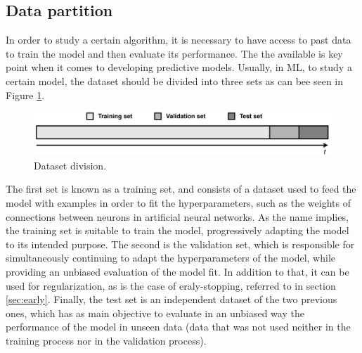 \subsection{Data partition}\label{sec:datap}

In order to study a certain algorithm, it is necessary to have access to past data to train the model and then evaluate its performance. The the available is key point when it comes to developing predictive models. Usually, in \ac{ML}, to study a certain model, the dataset should be divided into three sets as can bee seen in Figure \ref{division}. 

\begin{figure}[h!]
    \centering
    \begin{center}
    \includegraphics[width=1\textwidth]{Images/division.png}
    \caption{Dataset division.}
    \label{division}
    \end{center}
\end{figure}

The first set is known as a training set, and consists of a dataset used to feed the model with examples in order to fit the hyperparameters, such as the weights of connections between neurons in artificial neural networks. As the name implies, the training set is suitable to train the model, progressively adapting the model to its intended purpose. The second is the validation set, which is responsible for simultaneously continuing to adapt the hyperparameters of the model, while providing an unbiased evaluation of the model fit. In addition to that, it can be used for regularization, as is the case of eraly-stopping, referred to in section \ref{sec:early}. Finally, the test set is an independent dataset of the two previous ones, which has as main objective to evaluate in an unbiased way the performance of the model in unseen data (data that was not used neither in the training process nor in the validation process). 

